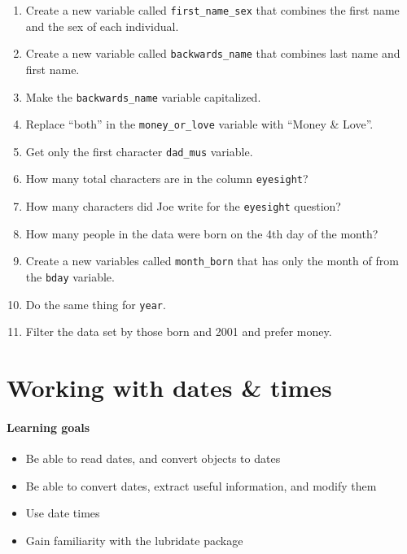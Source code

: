 \documentclass[
]{book}
\providecommand{\tightlist}{%
  \setlength{\itemsep}{0pt}\setlength{\parskip}{0pt}}
\begin{document}
\begin{enumerate}
\def\labelenumi{\arabic{enumi})}
\item
  Create a new variable called \texttt{first\_name\_sex} that combines the first name and the sex of each individual.
\item
  Create a new variable called \texttt{backwards\_name} that combines last name and first name.
\item
  Make the \texttt{backwards\_name} variable capitalized.
\item
  Replace ``both'' in the \texttt{money\_or\_love} variable with ``Money \& Love''.
\item
  Get only the first character \texttt{dad\_mus} variable.
\item
  How many total characters are in the column \texttt{eyesight}?
\item
  How many characters did Joe write for the \texttt{eyesight} question?
\item
  How many people in the data were born on the 4th day of the month?
\item
  Create a new variables called \texttt{month\_born} that has only the month of from the \texttt{bday} variable.
\item
  Do the same thing for \texttt{year}.
\item
  Filter the data set by those born and 2001 and prefer money.
\end{enumerate}

\hypertarget{dates}{%
\chapter{Working with dates \& times}\label{dates}}

\hypertarget{learning-goals-22}{%
\subsubsection*{Learning goals}\label{learning-goals-22}}

\begin{itemize}
\tightlist
\item
  Be able to read dates, and convert objects to dates
\item
  Be able to convert dates, extract useful information, and modify them
\item
  Use date times
\item
  Gain familiarity with the lubridate package
\end{itemize}
\end{document}
